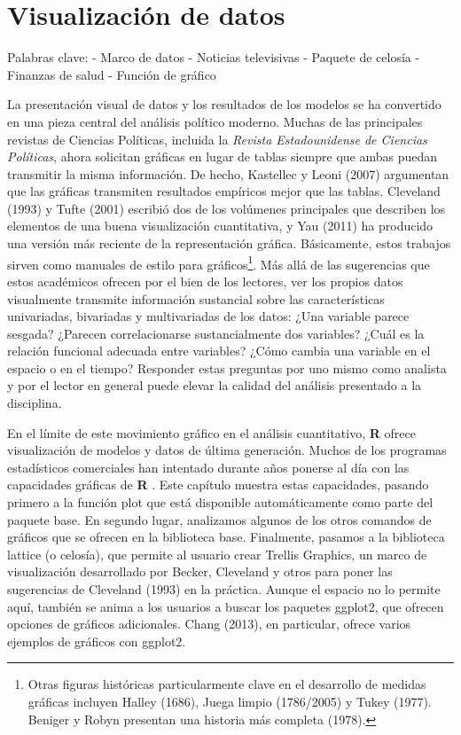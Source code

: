 \documentclass[
]{book}
\begin{document}
\hypertarget{Visualizaciondedatos}{%
\chapter{Visualización de datos}\label{Visualizaciondedatos}}

Palabras clave:
- Marco de datos
- Noticias televisivas
- Paquete de celosía
- Finanzas de salud
- Función de gráfico

La presentación visual de datos y los resultados de los modelos se ha convertido en una pieza central del análisis político moderno. Muchas de las principales revistas de Ciencias Políticas, incluida la \emph{Revista Estadounidense de Ciencias Políticas}, ahora solicitan gráficas en lugar de tablas siempre que ambas puedan transmitir la misma información. De hecho, Kastellec y Leoni (2007) argumentan que las gráficas transmiten resultados empíricos mejor que las tablas. Cleveland (1993) y Tufte (2001) escribió dos de los volúmenes principales que describen los elementos de una buena visualización cuantitativa, y Yau (2011) ha producido una versión más reciente de la representación gráfica. Básicamente, estos trabajos sirven como manuales de estilo para gráficos\footnote{Otras figuras históricas particularmente clave en el desarrollo de medidas gráficas incluyen Halley (1686), Juega limpio (1786/2005) y Tukey (1977). Beniger y Robyn presentan una historia más completa (1978).}. Más allá de las sugerencias que estos académicos ofrecen por el bien de los lectores, ver los propios datos visualmente transmite información sustancial sobre las características univariadas, bivariadas y multivariadas de los datos: ¿Una variable parece sesgada? ¿Parecen correlacionarse sustancialmente dos variables? ¿Cuál es la relación funcional adecuada entre variables? ¿Cómo cambia una variable en el espacio o en el tiempo? Responder estas preguntas por uno mismo como analista y por el lector en general puede elevar la calidad del análisis presentado a la disciplina.

En el límite de este movimiento gráfico en el análisis cuantitativo, \textbf{R} ofrece visualización de modelos y datos de última generación. Muchos de los programas estadísticos comerciales han intentado durante años ponerse al día con las capacidades gráficas de \textbf{R} . Este capítulo muestra estas capacidades, pasando primero a la función plot que está disponible automáticamente como parte del paquete base. En segundo lugar, analizamos algunos de los otros comandos de gráficos que se ofrecen en la biblioteca base. Finalmente, pasamos a la biblioteca lattice (o celosía), que permite al usuario crear Trellis Graphics, un marco de visualización desarrollado por Becker, Cleveland y otros para poner las sugerencias de Cleveland (1993) en la práctica. Aunque el espacio no lo permite aquí, también se anima a los usuarios a buscar los paquetes ggplot2, que ofrecen opciones de gráficos adicionales. Chang (2013), en particular, ofrece varios ejemplos de gráficos con ggplot2.
\end{document}
